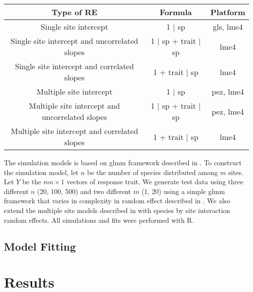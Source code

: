 \begin{tabular}{|c|c|c|}
\hline
Type of RE	& Formula	& Platform	\\
\hline

Single site intercept	  &	1 $\mid$ sp	& gls, lme4 \\
Single site intercept and uncorrelated slopes		&  1 $\mid$ sp + trait $\mid$ sp		& lme4 \\
Single site intercept and correlated slopes 			& 1 + trait $\mid$ sp					& lme4 \\
\hline
Multiple site intercept 									&  1 $\mid$ sp 						& pez, lme4 \\
Multiple site intercept and uncorrelated slopes 	&  1 $\mid$ sp + trait $\mid$ sp 		& pez, lme4 \\
Multiple site intercept and correlated slopes 	& 	1 + trait $\mid$ sp					& lme4 \\
\hline
\end{tabular}

The simulation models is based on glmm framework described in .   
To construct the simulation model, let $n$ be the number of species distributed among $m$ sites.
Let $Y$ be the $mn \times 1$ vectors of response trait.  
We generate test data using three different $n$ (20, 100, 500) and two different $m$ (1, 20) using a simple glmm framework that varies in complexity in random effect described in . 
We also extend the multiple site models described in  with species by site interaction random effects. 
All simulations and fits were performed with R. 

\subsection{Model Fitting}



\section{Results}




